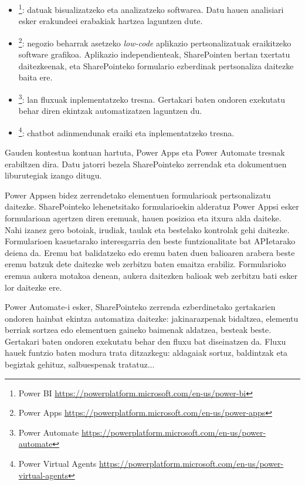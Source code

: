 \begin{itemize}
  \item {}\footnote{Power BI \url{https://powerplatform.microsoft.com/en-us/power-bi}}: datuak bisualizatzeko eta analizatzeko softwarea. Datu hauen analisiari esker erakundeei erabakiak hartzea
  laguntzen dute.
  \item {}\footnote{Power Apps \url{https://powerplatform.microsoft.com/en-us/power-apps}}: negozio beharrak asetzeko \textit{low-code} aplikazio pertsonalizatuak eraikitzeko software grafikoa. Aplikazio
  independienteak, SharePointen bertan txertatu daitezkeenak, eta SharePointeko formulario ezberdinak pertsonaliza daitezke baita ere.
  \item {}\footnote{Power Automate \url{https://powerplatform.microsoft.com/en-us/power-automate}}: lan fluxuak inplementatzeko tresna. Gertakari baten ondoren exekutatu behar diren ekintzak automatizatzen
  laguntzen du.
  \item {}\footnote{Power Virtual Agents \url{https://powerplatform.microsoft.com/en-us/power-virtual-agents}}: chatbot adinmendunak eraiki eta inplementatzeko tresna.
\end{itemize}

Gauden kontestua  kontuan hartuta, Power Apps eta Power Automate tresnak erabiltzen dira. Datu jatorri bezela SharePointeko
zerrendak eta dokumentuen liburutegiak izango ditugu.

Power Appsen bidez zerrendetako elementuen formularioak pertsonalizatu daitezke. SharePointeko lehenetsitako
formularioekin alderatuz Power Appsi esker formularioan agertzen diren eremuak, hauen posizioa eta itxura alda daiteke. Nahi izanez gero
botoiak, irudiak, taulak eta bestelako kontrolak gehi daitezke. Formularioen kasuetarako interesgarria den beste funtzionalitate bat APIetarako
deiena da. Eremu bat balidatzeko edo eremu baten duen balioaren arabera beste eremu batzuk dete daitezke web zerbitzu baten emaitza erabiliz.
Formularioko eremua aukera motakoa denean, aukera daitezken balioak web zerbitzu bati esker lor daitezke ere. 

Power Automate-i esker, SharePointeko zerrenda ezberdinetako gertakarien ondoren hainbat ekintza automatiza daitezke: jakinarazpenak bidaltzea,
elementu berriak sortzea edo elementuen gaineko baimenak aldatzea, besteak beste. Gertakari baten ondoren exekutatu behar den fluxu bat
diseinatzen da. Fluxu hauek funtzio baten modura trata ditzazkegu: aldagaiak sortuz, baldintzak eta begiztak gehituz, salbuespenak tratatuz...

